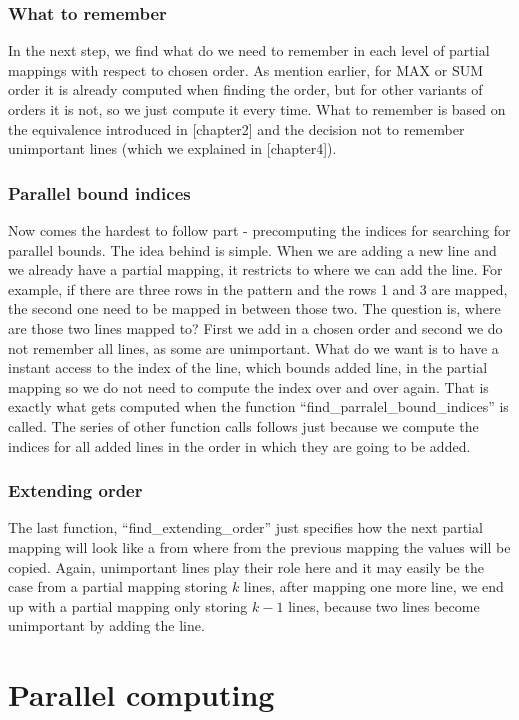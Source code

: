 \subsubsection{What to remember}
In the next step, we find what do we need to remember in each level of partial mappings with respect to chosen order. As mention earlier, for MAX or SUM order it is already computed when finding the order, but for other variants of orders it is not, so we just compute it every time. What to remember is based on the equivalence introduced in [chapter2] and the decision not to remember unimportant lines (which we explained in [chapter4]).

\subsubsection{Parallel bound indices}
Now comes the hardest to follow part - precomputing the indices for searching for parallel bounds. The idea behind is simple. When we are adding a new line and we already have a partial mapping, it restricts to where we can add the line. For example, if there are three rows in the pattern and the rows 1 and 3 are mapped, the second one need to be mapped in between those two. The question is, where are those two lines mapped to? First we add in a chosen order and second we do not remember all lines, as some are unimportant. What do we want is to have a instant access to the index of the line, which bounds added line, in the partial mapping so we do not need to compute the index over and over again. That is exactly what gets computed when the function ``find\_parralel\_bound\_indices'' is called. The series of other function calls follows just because we compute the indices for all added lines in the order in which they are going to be added.

\subsubsection{Extending order}
The last function, ``find\_extending\_order'' just specifies how the next partial mapping will look like a from where from the previous mapping the values will be copied. Again, unimportant lines play their role here and it may easily be the case from a partial mapping storing $k$ lines, after mapping one more line, we end up with a partial mapping only storing $k-1$ lines, because two lines become unimportant by adding the line.

\section{Parallel computing}

